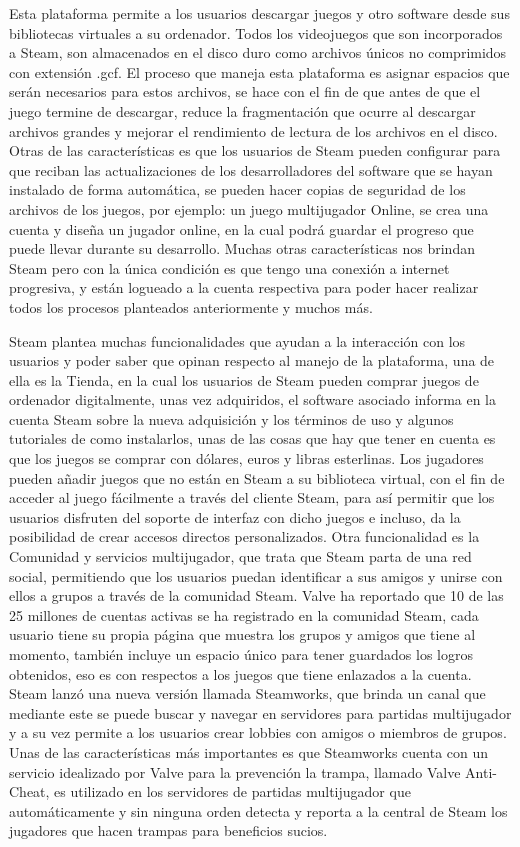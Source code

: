 Esta plataforma permite a los usuarios descargar juegos y otro
software desde sus bibliotecas virtuales a su ordenador. Todos
los videojuegos que son incorporados a Steam, son almacenados
en el disco duro como archivos únicos no comprimidos con
extensión .gcf. El proceso que maneja esta plataforma es
asignar espacios que serán necesarios para estos archivos, se
hace con el fin de que antes de que el juego termine de
descargar, reduce la fragmentación que ocurre al descargar
archivos grandes y mejorar el rendimiento de lectura de los
archivos en el disco. Otras de las características es que los
usuarios de Steam pueden configurar para que reciban las
actualizaciones de los desarrolladores del software que se hayan
instalado de forma automática, se pueden hacer copias de
seguridad de los archivos de los juegos, por ejemplo: un juego
multijugador Online, se crea una cuenta y diseña un jugador
online, en la cual podrá guardar el progreso que puede llevar
durante su desarrollo. Muchas otras características nos brindan
Steam pero con la única condición es que tengo una conexión a
internet progresiva, y están logueado a la cuenta respectiva
para poder hacer realizar todos los procesos planteados
anteriormente y muchos más.

Steam plantea muchas funcionalidades que ayudan a la
interacción con los usuarios y poder saber que opinan respecto
al manejo de la plataforma, una de ella es la Tienda, en la cual
los usuarios de Steam pueden comprar juegos de ordenador
digitalmente, unas vez adquiridos, el software asociado informa
en la cuenta Steam sobre la nueva adquisición y los términos de
uso y algunos tutoriales de como instalarlos, unas de las cosas
que hay que tener en cuenta es que los juegos se comprar con
dólares, euros y libras esterlinas. Los jugadores pueden añadir
juegos que no están en Steam a su biblioteca virtual, con el fin
de acceder al juego fácilmente a través del cliente Steam, para
así permitir que los usuarios disfruten del soporte de interfaz
con dicho juegos e incluso, da la posibilidad de crear accesos
directos personalizados. Otra funcionalidad es la Comunidad y
servicios multijugador, que trata que Steam parta de una red
social, permitiendo que los usuarios puedan identificar a sus
amigos y unirse con ellos a grupos a través de la comunidad
Steam. Valve ha reportado que 10 de las 25 millones de cuentas
activas se ha registrado en la comunidad Steam, cada usuario
tiene su propia página que muestra los grupos y amigos que
tiene al momento, también incluye un espacio único para tener
guardados los logros obtenidos, eso es con respectos a los
juegos que tiene enlazados a la cuenta. Steam lanzó una nueva
versión llamada Steamworks, que brinda un canal que mediante
este se puede buscar y navegar en servidores para partidas
multijugador y a su vez permite a los usuarios crear lobbies con
amigos o miembros de grupos. Unas de las características más
importantes es que Steamworks cuenta con un servicio
idealizado por Valve para la prevención la trampa, llamado Valve
Anti-Cheat, es utilizado en los servidores de partidas
multijugador que automáticamente y sin ninguna orden detecta
y reporta a la central de Steam los jugadores que hacen trampas
para beneficios sucios.

